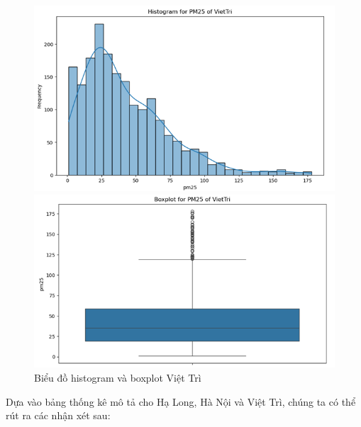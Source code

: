 \begin{figure}[H]
  \centering
  \begin{minipage}{0.22\textwidth}
  \centering
  \end{minipage}
  \hfill

      \begin{minipage}{0.23\textwidth}
      \centering
      \includegraphics[width=1\textwidth]{img/final/Dataset/histogram_vt.png}
      \end{minipage}
      \hfill
      \begin{minipage}{0.24\textwidth}
      \centering
      \includegraphics[width=1\textwidth]{img/final/Dataset/boxplot_vt.png}
      \end{minipage}

  \caption{Biểu đồ histogram và boxplot Việt Trì}
  \label{fig:Random_Forest}
\end{figure}

Dựa vào bảng thống kê mô tả cho Hạ Long, Hà Nội và Việt Trì, chúng ta có thể rút ra các nhận xét sau:

